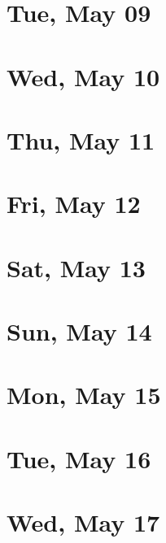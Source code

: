 	\section{Tue, May 09}
		
		
	\section{Wed, May 10}
		
		
	\section{Thu, May 11}
		
		
	\section{Fri, May 12}
		
		
	\section{Sat, May 13}
		
		
	\section{Sun, May 14}
		
		
	\section{Mon, May 15}
		
		
	\section{Tue, May 16}
		
		
	\section{Wed, May 17}
		
		
